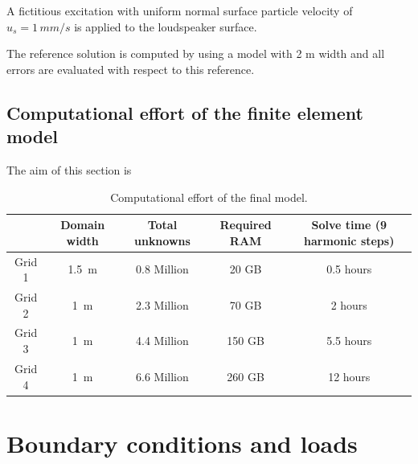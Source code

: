 A fictitious excitation with uniform normal surface particle velocity of $u_s = 1\,mm/s$ is applied to the loudspeaker surface.

The reference solution is computed by using a model with 2 m width and all errors are evaluated with respect to this reference.




\newpage
\subsection*{Computational effort of the finite element model}
The aim of this section is

\begin{table}[H]
	\centering
	\caption{Computational effort of the final model.}
	\label{tab:computational_effort}
	\begin{tabular}{ccccc}
		\toprule
		& Domain width & Total unknowns & Required RAM & Solve time (9 harmonic steps) \\
		\midrule
		Grid 1 & \SI{1.5}{\meter} & 0.8 Million & 20 GB & 0.5 hours \\
		Grid 2 & \SI{1}{\meter} & 2.3 Million & 70 GB & 2 hours \\
		Grid 3 & \SI{1}{\meter} & 4.4 Million & 150 GB & 5.5 hours \\
		Grid 4 & \SI{1}{\meter} & 6.6 Million & 260 GB & 12 hours \\
		\bottomrule
	\end{tabular}
\end{table}



\newpage
\section{Boundary conditions and loads}
\label{section:boundary_conditions}

